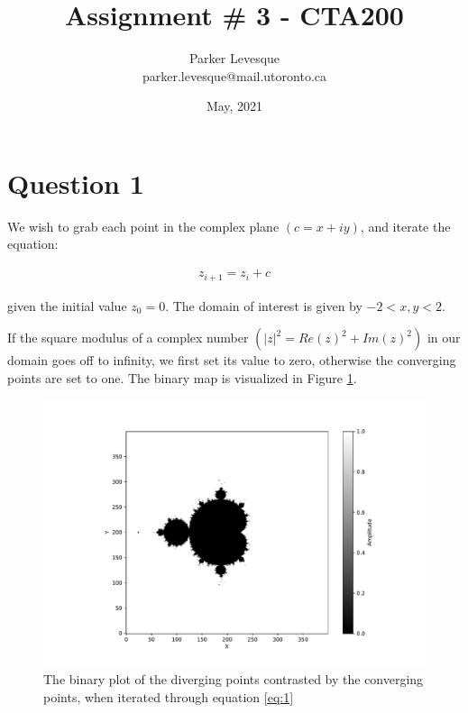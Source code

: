 \documentclass[10pt, letterpaper]{article}
\title{Assignment \# 3 - CTA200}
\author{Parker Levesque \\ parker.levesque@mail.utoronto.ca}
\date{May, 2021}
\begin{document}
\maketitle

\newpage


\section{Question 1}

We wish to grab each point in the complex plane $\left( c = x + iy \right)$, and iterate the equation:

\begin{align}
    z_{i+1} = z_{i} + c \label{eq:1}
\end{align}

given the initial value $z_0 = 0$. The domain of interest is given by $-2 < x,y < 2$.

If the square modulus of a complex number $\left( |z|^2 = Re(z)^2 + Im(z)^2 \right)$ in our domain goes off to infinity, we first set its value to zero, otherwise the converging points are set to one. The binary map is visualized in Figure \ref{fig:m1}.

\begin{figure}[H]
    \hspace*{-5mm}
        \centering
        \includegraphics[width =\textwidth]{mandel1.pdf}
        \caption{The binary plot of the diverging points contrasted by the converging points, when iterated through equation \ref{eq:1}}
        \label{fig:m1}
\end{figure}
\end{document}
